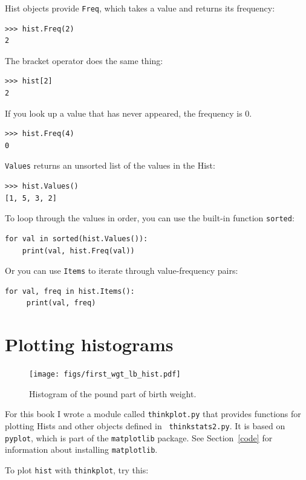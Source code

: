 \documentclass[12pt]{book}
\theoremstyle{exercise}
\begin{document}
Hist objects provide {\tt Freq}, which takes a value and
returns its frequency:%
%
\begin{verbatim}
>>> hist.Freq(2)
2
\end{verbatim}

The bracket operator does the same thing:%
%
\begin{verbatim}
>>> hist[2]
2
\end{verbatim}

If you look up a value that has never appeared, the frequency is 0.
%
\begin{verbatim}
>>> hist.Freq(4)
0
\end{verbatim}

{\tt Values} returns an unsorted list of the values in the Hist:
%
\begin{verbatim}
>>> hist.Values()
[1, 5, 3, 2]
\end{verbatim}

To loop through the values in order, you can use the built-in function
{\tt sorted}:
%
\begin{verbatim}
for val in sorted(hist.Values()):
    print(val, hist.Freq(val))
\end{verbatim}

Or you can use {\tt Items} to iterate through
value-frequency pairs:%
%
\begin{verbatim}
for val, freq in hist.Items():
     print(val, freq)
\end{verbatim}


\section{Plotting histograms}%

\begin{figure}
\centerline{\texttt{[image: figs/first\_wgt\_lb\_hist.pdf]}}
\caption{Histogram of the pound part of birth weight.}%
\label{first_wgt_lb_hist}
\end{figure}

For this book I wrote a module called {\tt thinkplot.py} that provides
functions for plotting Hists and other objects defined in {\tt
  thinkstats2.py}.  It is based on {\tt pyplot}, which is part of the
{\tt matplotlib} package.  See Section~\ref{code} for information
about installing {\tt matplotlib}.%
%

To plot {\tt hist} with {\tt thinkplot}, try this:%
\end{document}
